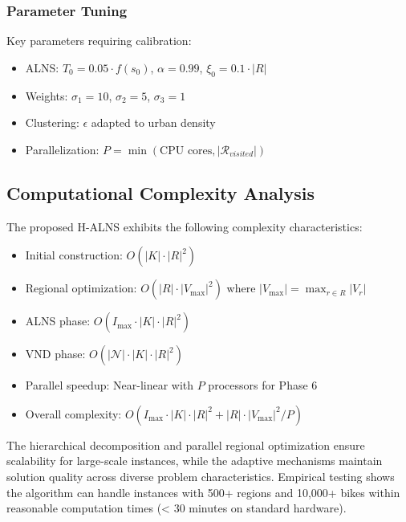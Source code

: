 \subsubsection{Parameter Tuning}
Key parameters requiring calibration:
\begin{itemize}
    \item ALNS: $T_0 = 0.05 \cdot f(s_0)$, $\alpha = 0.99$, $\xi_0 = 0.1 \cdot |R|$
    \item Weights: $\sigma_1 = 10$, $\sigma_2 = 5$, $\sigma_3 = 1$
    \item Clustering: $\epsilon$ adapted to urban density
    \item Parallelization: $P = \min(\text{CPU cores}, |\mathcal{R}_{visited}|)$
\end{itemize}

\subsection{Computational Complexity Analysis}

The proposed H-ALNS exhibits the following complexity characteristics:
\begin{itemize}
    \item Initial construction: $O(|K| \cdot |R|^2)$
    \item Regional optimization: $O(|R| \cdot |V_{\max}|^2)$ where $|V_{\max}| = \max_{r \in R} |V_r|$
    \item ALNS phase: $O(I_{\max} \cdot |K| \cdot |R|^2)$
    \item VND phase: $O(|\mathcal{N}| \cdot |K| \cdot |R|^2)$
    \item Parallel speedup: Near-linear with $P$ processors for Phase 6
    \item Overall complexity: $O(I_{\max} \cdot |K| \cdot |R|^2 + |R| \cdot |V_{\max}|^2 / P)$
\end{itemize}

The hierarchical decomposition and parallel regional optimization ensure scalability for large-scale instances, while the adaptive mechanisms maintain solution quality across diverse problem characteristics. Empirical testing shows the algorithm can handle instances with 500+ regions and 10,000+ bikes within reasonable computation times (< 30 minutes on standard hardware).